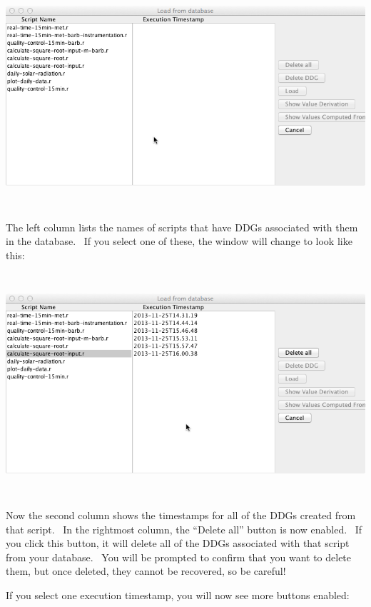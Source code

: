 \documentclass[letterpaper]{article}
\begin{document}
 \includegraphics[width=6.5in,height=3.25in]{UsingDDGExplorer-img/UsingDDGExplorer-img005.png} 


\bigskip

{\mdseries\upshape\color{black}
The left column lists the names of scripts that have DDGs associated with them in the database. \ If you select one of these, the window will change to look like this:}

 \includegraphics[width=6.5in,height=3.25in]{UsingDDGExplorer-img/UsingDDGExplorer-img006.png} 

{\mdseries\upshape\color{black}
Now the second column shows the timestamps for all of the DDGs created from that script. \ In the rightmost column, the “Delete all” button is now enabled. \ If you click this button, it will delete all of the DDGs associated with that script from your database. \ You will be prompted to confirm that you want to delete them, but once deleted, they cannot be recovered, so be careful!}

{\mdseries\upshape\color{black}
If you select one execution timestamp, you will now see more buttons enabled:}
\end{document}
